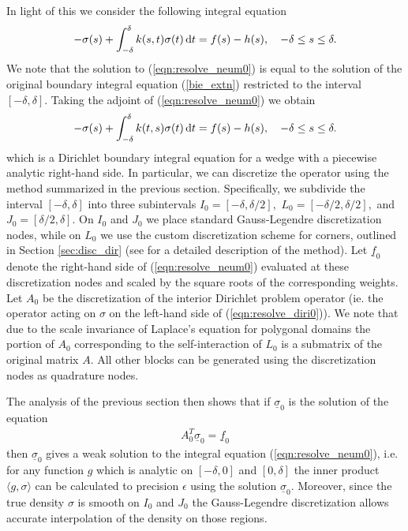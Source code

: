 In light of this we consider the following integral equation
\begin{align}\label{eqn:resolve_neum0}
-\sigma(s) + \int_{-\delta}^\delta k(s,t) \sigma(t)\,{\rm d}t = f(s)-h(s), \quad -\delta \le s \le \delta.
\end{align}
We note that the solution to (\ref{eqn:resolve_neum0}) is equal to the solution of the original boundary integral equation (\ref{bie_extn}) restricted to the interval $[-\delta,\delta].$ Taking the adjoint of (\ref{eqn:resolve_neum0}) we obtain
\begin{align}\label{eqn:resolve_diri0}
-\sigma(s) + \int_{-\delta}^\delta k(t,s) \sigma(t)\,{\rm d}t = f(s)-h(s), \quad -\delta \le s \le \delta.
\end{align}
which is a Dirichlet boundary integral equation for a wedge with a piecewise analytic right-hand side. In particular, we can discretize the operator using the method summarized in the previous section. Specifically, we subdivide the interval $[-\delta,\delta]$ into three subintervals $I_0 = [-\delta,\delta/2],$ $L_0 = [-\delta/2,\delta/2],$ and $J_0 = [\delta/2,\delta].$ On $I_0$ and $J_0$ we place standard Gauss-Legendre discretization nodes, while on $L_0$ we use the custom discretization scheme for corners, outlined in Section \ref{sec:disc_dir} (see \cite{} for a detailed description of the method). Let $\underline{f}_0$ denote the right-hand side of (\ref{eqn:resolve_neum0}) evaluated at these discretization nodes and scaled by the square roots of the corresponding weights. Let $A_0$ be the discretization of the interior Dirichlet problem operator (ie. the operator acting on $\sigma$ on the left-hand side of (\ref{eqn:resolve_diri0})). We note that due to the scale invariance of Laplace's equation for polygonal domains the portion of $A_0$ corresponding to the self-interaction of $L_0$ is a submatrix of the original matrix $A.$ All other blocks can be generated using the discretization nodes as quadrature nodes.

The analysis of the previous section then shows that if $\underline{\sigma}_0$ is the solution of the equation
\begin{align}
A_0^T \underline{\sigma}_0 = \underline{f}_0
\end{align}
then $\underline{\sigma}_0$ gives a {weak solution} to the integral equation (\ref{eqn:resolve_neum0}), i.e. for any function $g$ which is analytic on $[-\delta,0]$ and $[0,\delta]$ the inner product $\langle g,\sigma \rangle$ can be calculated to precision $\epsilon$ using the solution $\underline{\sigma}_0.$ Moreover, since the true density $\sigma$ is smooth on $I_0$ and $J_0$ the Gauss-Legendre discretization allows accurate interpolation of the density on those regions.

